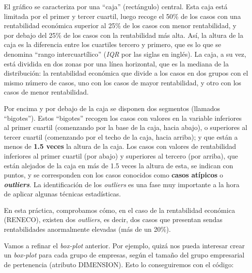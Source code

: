 \documentclass[
]{book}
\begin{document}
El gráfico se caracteriza por una ``caja'' (rectángulo) central. Esta caja está limitada por el primer y tercer cuartil, luego recoge el 50\% de los casos con una rentabilidad económica superior al 25\% de los casos con menor rentabilidad, y por debajo del 25\% de los casos con la rentabilidad más alta. Así, la altura de la caja es la diferencia entre los cuartiles tercero y primero, que es lo que se denomina ``rango intercuartílico'' (\emph{IQR} por las siglas en inglés). La caja, a su vez, está dividida en dos zonas por una línea horizontal, que es la mediana de la distribución: la rentabilidad económica que divide a los casos en dos grupos con el mismo número de casos, uno con los casos de mayor rentabilidad, y otro con los casos de menor rentabilidad.

Por encima y por debajo de la caja se disponen dos segmentos (llamados ``bigotes''). Estos ``bigotes'' recogen los casos con valores en la variable inferiores al primer cuartil (comenzando por la base de la caja, hacia abajo), o superiores al tercer cuartil (comenzando por el techo de la caja, hacia arriba); y que están a menos de \textbf{1.5 veces} la altura de la caja. Los casos con valores de rentabilidad inferiores al primer cuartil (por abajo) y superiores al tercero (por arriba), que están alejados de la caja en más de 1.5 veces la altura de esta, se indican con puntos, y se corresponden con los casos conocidos como \textbf{casos atípicos} o \textbf{\emph{outliers}}. La identificación de los \emph{outliers} es una fase muy importante a la hora de aplicar algunas técnicas estadísticas.

En esta práctica, comprobamos cómo, en el caso de la rentabilidad económica (RENECO), existen dos \emph{outliers}, es decir, dos casos que presentan sendas rentabilidades anormalmente elevadas (más de un 20\%).

Vamos a refinar el \emph{box-plot} anterior. Por ejemplo, quizá nos pueda interesar crear un \emph{box-plot} para cada grupo de empresas, según el tamaño del grupo empresarial de pertenencia (atributo DIMENSION). Esto lo conseguiremos con el código:
\end{document}
